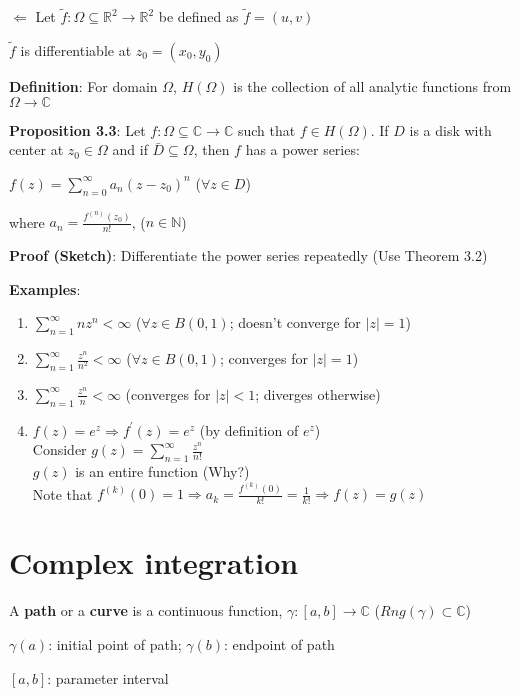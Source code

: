 \documentclass{article}
\begin{document}
\begin{flushleft}
$\Leftarrow$ Let $\tilde{f}:\Omega \subseteq \mathds{R}^2\rightarrow \mathds{R}^2$ be defined as $\tilde{f}=(u,v)$

$\tilde{f}$ is differentiable at $z_0=(x_0,y_0)$

\textbf{Definition}: For domain $\Omega$, $H(\Omega)$ is the collection of all analytic functions from $\Omega \rightarrow \mathds{C}$

\textbf{Proposition 3.3}: Let $f:\Omega\subseteq \mathds{C} \rightarrow \mathds{C}$ such that $f\in H(\Omega)$. If $D$ is a disk with center at $z_0\in \Omega$ and if $\bar{D}\subseteq \Omega$, then $f$ has a power series:

$f(z)=\sum_{n=0}^{\infty} a_n(z-z_0)^n$ ($\forall z\in D$) 

where $a_n=\frac{f^{(n)}(z_0)}{n!}$, ($n\in \mathds{N}$)

\textbf{Proof (Sketch)}: Differentiate the power series repeatedly (Use Theorem 3.2)

\textbf{Examples}: 
\begin{enumerate}
\item $\sum_{n=1}^{\infty} nz^n <\infty$ ($\forall z \in B(0,1)$; doesn't converge for $|z|=1$) 
\item $\sum_{n=1}^{\infty} \frac{z^n}{n^2} <\infty$ ($\forall z\in B(0,1)$; converges for $|z|=1$)
\item $\sum_{n=1}^{\infty} \frac{z^n}{n} <\infty$ (converges for $|z|<1$; diverges otherwise)
\item $f(z)=e^z \Rightarrow f^{'}(z)=e^z$ (by definition of $e^z$)\\
Consider $g(z)=\sum_{n=1}^{\infty} \frac{z^n}{n!}$ \\
$g(z)$ is an entire function (Why?)\\
Note that $f^{(k)}(0)=1\Rightarrow a_k=\frac{f^{(k)}(0)}{k!}=\frac{1}{k!}\Rightarrow f(z)=g(z)$
\end{enumerate}
\clearpage

\section{Complex integration}

A \textbf{path} or a \textbf{curve} is a continuous function, $\gamma:[a,b]\rightarrow \mathds{C}$ 
($Rng(\gamma)\subset \mathds{C}$) 

$\gamma(a)$: initial point of path; $\gamma(b)$: endpoint of path

$[a,b]$: parameter interval 


\end{flushleft}
\end{document}
